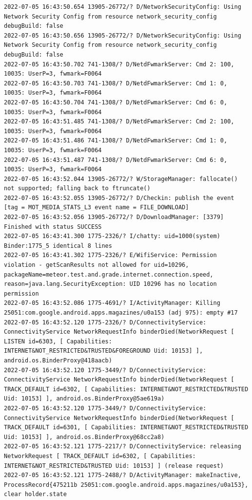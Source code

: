 \documentclass[a4paper,12pt]{book}
\begin{document}
\begin{lstlisting}
2022-07-05 16:43:50.654 13905-26772/? D/NetworkSecurityConfig: Using Network Security Config from resource network_security_config debugBuild: false
2022-07-05 16:43:50.656 13905-26772/? D/NetworkSecurityConfig: Using Network Security Config from resource network_security_config debugBuild: false
2022-07-05 16:43:50.702 741-1308/? D/NetdFwmarkServer: Cmd 2: 100, 10035: UserP=3, fwmark=F0064
2022-07-05 16:43:50.703 741-1308/? D/NetdFwmarkServer: Cmd 1: 0, 10035: UserP=3, fwmark=F0064
2022-07-05 16:43:50.704 741-1308/? D/NetdFwmarkServer: Cmd 6: 0, 10035: UserP=3, fwmark=F0064
2022-07-05 16:43:51.485 741-1308/? D/NetdFwmarkServer: Cmd 2: 100, 10035: UserP=3, fwmark=F0064
2022-07-05 16:43:51.486 741-1308/? D/NetdFwmarkServer: Cmd 1: 0, 10035: UserP=3, fwmark=F0064
2022-07-05 16:43:51.487 741-1308/? D/NetdFwmarkServer: Cmd 6: 0, 10035: UserP=3, fwmark=F0064
2022-07-05 16:43:52.044 13905-26772/? W/StorageManager: fallocate() not supported; falling back to ftruncate()
2022-07-05 16:43:52.055 13905-26772/? D/Checkin: publish the event [tag = MOT_MEDIA_STATS_L3 event name = FILE_DOWNLOAD]
2022-07-05 16:43:52.056 13905-26772/? D/DownloadManager: [3379] Finished with status SUCCESS
2022-07-05 16:43:41.300 1775-2326/? I/chatty: uid=1000(system) Binder:1775_5 identical 8 lines
2022-07-05 16:43:41.302 1775-2326/? E/WifiService: Permission violation - getScanResults not allowed for uid=10296, packageName=meteor.test.and.grade.internet.connection.speed, reason=java.lang.SecurityException: UID 10296 has no location permission
2022-07-05 16:43:52.086 1775-4691/? I/ActivityManager: Killing 25051:com.google.android.apps.magazines/u0a153 (adj 975): empty #17
2022-07-05 16:43:52.120 1775-2326/? D/ConnectivityService: ConnectivityService NetworkRequestInfo binderDied(NetworkRequest [ LISTEN id=6303, [ Capabilities: INTERNET&NOT_RESTRICTED&TRUSTED&FOREGROUND Uid: 10153] ], android.os.BinderProxy@418aacb)
2022-07-05 16:43:52.120 1775-3449/? D/ConnectivityService: ConnectivityService NetworkRequestInfo binderDied(NetworkRequest [ TRACK_DEFAULT id=6302, [ Capabilities: INTERNET&NOT_RESTRICTED&TRUSTED Uid: 10153] ], android.os.BinderProxy@5ae619a)
2022-07-05 16:43:52.120 1775-3449/? D/ConnectivityService: ConnectivityService NetworkRequestInfo binderDied(NetworkRequest [ TRACK_DEFAULT id=6301, [ Capabilities: INTERNET&NOT_RESTRICTED&TRUSTED Uid: 10153] ], android.os.BinderProxy@68cc2a8)
2022-07-05 16:43:52.121 1775-2217/? D/ConnectivityService: releasing NetworkRequest [ TRACK_DEFAULT id=6302, [ Capabilities: INTERNET&NOT_RESTRICTED&TRUSTED Uid: 10153] ] (release request)
2022-07-05 16:43:52.121 1775-2488/? D/ActivityManager: makeInactive, ProcessRecord{475211b 25051:com.google.android.apps.magazines/u0a153}, clear holder.state

\end{lstlisting}
\end{document}
